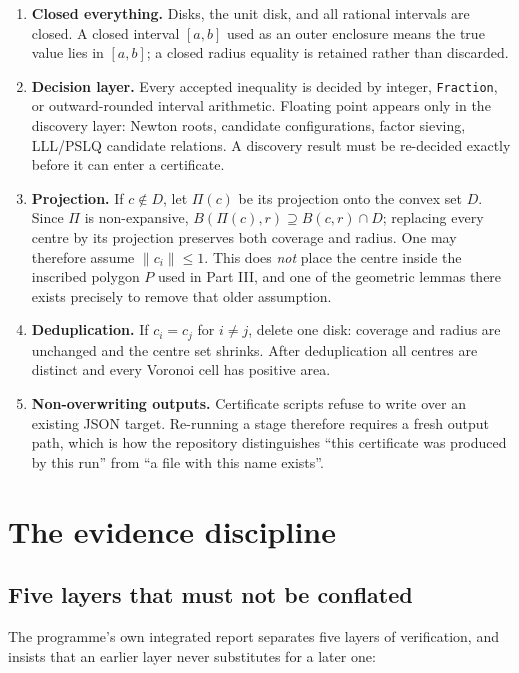 \begin{enumerate}[leftmargin=1.6em,itemsep=3pt]
\item \textbf{Closed everything.} Disks, the unit disk, and all rational intervals are closed.
A closed interval $[a,b]$ used as an outer enclosure means the true value lies in $[a,b]$; a
closed radius equality is retained rather than discarded.
\item \textbf{Decision layer.} Every accepted inequality is decided by integer, \texttt{Fraction},
or outward-rounded interval arithmetic. Floating point appears only in the discovery layer: Newton
roots, candidate configurations, factor sieving, LLL/PSLQ candidate relations. A discovery result
must be re-decided exactly before it can enter a certificate.
\item \textbf{Projection.} If $c\notin D$, let $\Pi(c)$ be its projection onto the convex set $D$.
Since $\Pi$ is non-expansive, $B(\Pi(c),r)\supseteq B(c,r)\cap D$; replacing every centre by its
projection preserves both coverage and radius. One may therefore assume $\|c_i\|\le1$. This does
\emph{not} place the centre inside the inscribed polygon $P$ used in Part III, and one of the
geometric lemmas there exists precisely to remove that older assumption.
\item \textbf{Deduplication.} If $c_i=c_j$ for $i\ne j$, delete one disk: coverage and radius are
unchanged and the centre set shrinks. After deduplication all centres are distinct and every
Voronoi cell has positive area.
\item \textbf{Non-overwriting outputs.} Certificate scripts refuse to write over an existing JSON
target. Re-running a stage therefore requires a fresh output path, which is how the repository
distinguishes ``this certificate was produced by this run'' from ``a file with this name exists''.
\end{enumerate}

\section{The evidence discipline}

\subsection{Five layers that must not be conflated}

The programme's own integrated report separates five layers of verification, and insists that an
earlier layer never substitutes for a later one:

